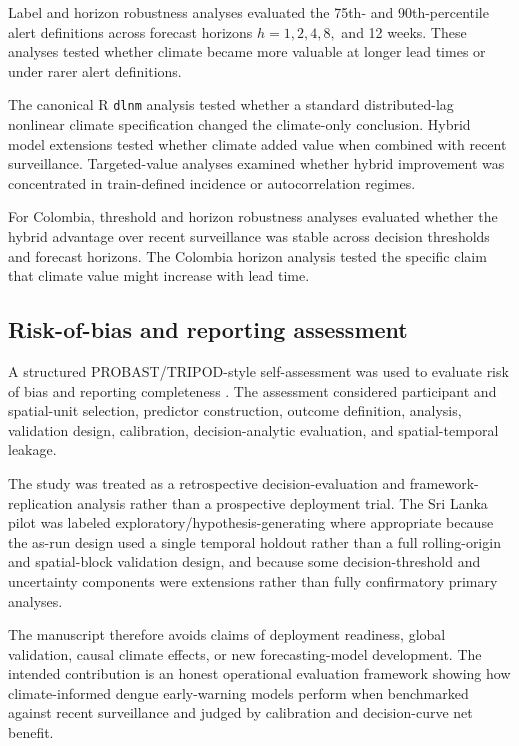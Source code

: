 \documentclass[11pt,a4paper]{article}
\begin{document}
Label and horizon robustness analyses evaluated the 75th- and 90th-percentile alert definitions across forecast horizons $h=1,2,4,8,$ and 12 weeks. These analyses tested whether climate became more valuable at longer lead times or under rarer alert definitions.

The canonical R \texttt{dlnm} analysis tested whether a standard distributed-lag nonlinear climate specification changed the climate-only conclusion. Hybrid model extensions tested whether climate added value when combined with recent surveillance. Targeted-value analyses examined whether hybrid improvement was concentrated in train-defined incidence or autocorrelation regimes.

For Colombia, threshold and horizon robustness analyses evaluated whether the hybrid advantage over recent surveillance was stable across decision thresholds and forecast horizons. The Colombia horizon analysis tested the specific claim that climate value might increase with lead time.

\subsection{Risk-of-bias and reporting assessment}
\label{subsec:risk-of-bias}

A structured PROBAST/TRIPOD-style self-assessment was used to evaluate risk of bias and
reporting completeness \citep{Collins2015,Moons2019,Wolff2019}. The assessment considered participant and spatial-unit selection, predictor construction, outcome definition, analysis, validation design, calibration, decision-analytic evaluation, and spatial-temporal leakage.

The study was treated as a retrospective decision-evaluation and framework-replication analysis rather than a prospective deployment trial. The Sri Lanka pilot was labeled exploratory/hypothesis-generating where appropriate because the as-run design used a single temporal holdout rather than a full rolling-origin and spatial-block validation design, and because some decision-threshold and uncertainty components were extensions rather than fully confirmatory primary analyses.

The manuscript therefore avoids claims of deployment readiness, global validation, causal climate effects, or new forecasting-model development. The intended contribution is an honest operational evaluation framework showing how climate-informed dengue early-warning models perform when benchmarked against recent surveillance and judged by calibration and decision-curve net benefit.
\end{document}
